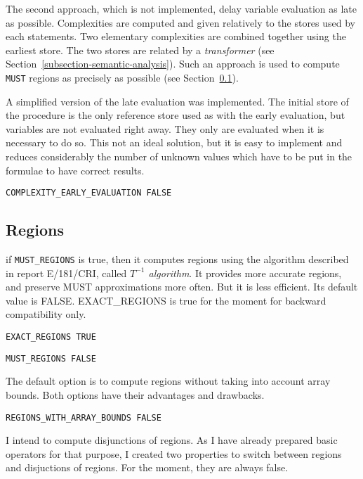 The second approach, which is not implemented, delay variable evaluation
as late as possible. Complexities are computed and given relatively to
the stores used by each statements. Two elementary complexities are combined
together using the earliest store. The two stores are related by a {\em
transformer} (see Section~\ref{subsection-semantic-analysis}). Such an
approach is used to compute {\tt MUST} regions as precisely as possible
(see Section~\ref{subsection-regions}).

A simplified version of the late evaluation was implemented. The initial
store of the procedure is the only reference store used as with the
early evaluation, but variables are not evaluated right away. They only
are evaluated when it is necessary to do so. This not an ideal solution,
but it is easy to implement and reduces considerably the number of
unknown values which have to be put in the formulae to have correct
results.


\begin{verbatim}
COMPLEXITY_EARLY_EVALUATION FALSE
\end{verbatim}

\subsection{Regions}
\label{subsection-regions}

if {\tt MUST\_REGIONS} is true, then it computes regions using the
algorithm described in report E/181/CRI, called {\em $T^{-1}$
algorithm}. It provides more accurate regions, and preserve MUST
approximations more often. But it is less efficient. Its default value
is FALSE. EXACT\_REGIONS is true for the moment for backward
compatibility only.

\begin{verbatim}
EXACT_REGIONS TRUE
\end{verbatim}

\begin{verbatim}
MUST_REGIONS FALSE
\end{verbatim}

The default option is to compute regions without taking into account array
bounds. Both options have their advantages and drawbacks. 

\begin{verbatim}
REGIONS_WITH_ARRAY_BOUNDS FALSE
\end{verbatim}

I intend to compute disjunctions of regions. As I have already prepared basic
operators for that purpose, I created two properties to switch between regions
and disjuctions of regions. For the moment, they are always false.


